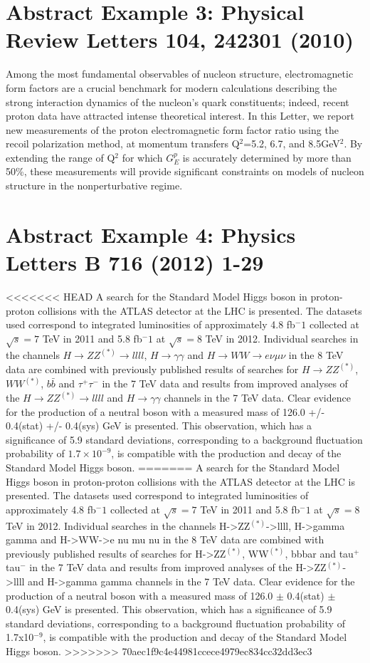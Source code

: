 \documentclass{article}
\begin{document}
\section{Abstract Example 3: Physical Review Letters 104, 242301 (2010)}
Among the most fundamental observables of nucleon structure, electromagnetic
form factors are a crucial benchmark for modern calculations describing the
strong interaction dynamics of the nucleon's quark constituents; indeed,
recent proton data have attracted intense theoretical interest. In this
Letter, we report new measurements of the proton electromagnetic form factor
ratio using the recoil polarization method, at momentum transfers 
Q$^2$=5.2, 6.7, and 8.5GeV$^2$. By extending the range of Q$^2$ for which
$G_E^p$ is accurately determined by more than 50\%, these measurements will
provide significant constraints on models of nucleon structure in the
nonperturbative regime.

\section{Abstract Example 4: Physics Letters B 716 (2012) 1-29}
<<<<<<< HEAD
A search for the Standard Model Higgs boson in proton-proton collisions with the ATLAS detector at the LHC is presented. The datasets used correspond to integrated luminosities of approximately 4.8 fb$^-1$ collected at $\sqrt{s} = 7$ TeV in 2011 and 5.8 fb$^-1$ at $\sqrt{s} = 8$ TeV in 2012. Individual searches in the channels $H \rightarrow ZZ^{(*)}\rightarrow llll$, $H\rightarrow\gamma \gamma$ and $H\rightarrow WW \rightarrow e \nu \mu \nu$ in the 8 TeV data are combined with previously published results of searches for $H\rightarrow ZZ^{(*)}$, $WW^{(*)}$, $b\bar{b}$ and $\tau^+\tau^-$ in the 7 TeV data and results from improved analyses of the $H\rightarrow ZZ^{(*)}\rightarrow llll$ and $H\rightarrow \gamma \gamma$ channels in the 7 TeV data. Clear evidence for the production of a neutral boson with a measured mass of 126.0 +/- 0.4(stat) +/- 0.4(sys) GeV is presented. This observation, which has a significance of 5.9 standard deviations, corresponding to a background fluctuation probability of $1.7\times 10^{-9}$, is compatible with the production and decay of the Standard Model Higgs boson.
=======
A search for the Standard Model Higgs boson in proton-proton collisions
with the ATLAS detector at the LHC is presented. The datasets used correspond
to integrated luminosities of approximately 4.8 fb$^-1$ collected at
$\sqrt{s} = 7$ TeV in 2011 and 5.8 fb$^-1$ at $\sqrt{s} = 8$ TeV in 2012.
Individual searches in the channels H->ZZ$^(*)$->llll, H->gamma gamma and
H->WW->e nu mu nu in the 8 TeV data are combined with previously published
results of searches for H->ZZ$^(*)$, WW$^(*)$, bbbar and tau$^+$tau$^-$ in
the 7 TeV data and results from improved analyses of the H->ZZ$^(*)$->llll
and H->gamma gamma channels in the 7 TeV data. Clear evidence for the
production of a neutral boson with a measured mass of 126.0 $\pm$ 0.4(stat)
$\pm$ 0.4(sys) GeV is presented. This observation, which has a significance
of 5.9 standard deviations, corresponding to a background fluctuation
probability of 1.7x10$^{-9}$, is compatible with the production and decay
of the Standard Model Higgs boson.
>>>>>>> 70aec1f9c4e44981ccece4979ec834cc32dd3ec3
\end{document}
